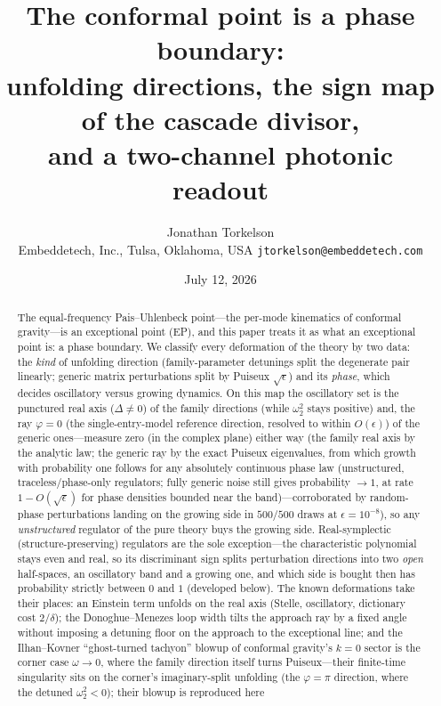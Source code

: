 ﻿\documentclass[11pt]{article}
\title{The conformal point is a phase boundary:\\
unfolding directions, the sign map of the cascade divisor,\\
and a two-channel photonic readout}
\author{Jonathan Torkelson\\[2pt]
\small Embeddetech, Inc., Tulsa, Oklahoma, USA \quad
\texttt{jtorkelson@embeddetech.com}}
\date{July 12, 2026}
\theoremstyle{remark}
\begin{document}
\maketitle

\begin{abstract}
\noindent The equal-frequency Pais--Uhlenbeck point---the per-mode
kinematics of conformal gravity---is an exceptional point (EP), and
this paper treats it as what an exceptional point is: a phase
boundary. We classify every deformation of the theory by two data:
the \emph{kind} of unfolding direction (family-parameter detunings
split the degenerate pair linearly; generic matrix perturbations
split by Puiseux $\sqrt\epsilon$) and its \emph{phase}, which
decides oscillatory versus growing dynamics. On this map the
oscillatory set is the punctured real axis ($\Delta\neq0$) of the family directions (while
$\omega_2^2$ stays positive) and, the ray $\varphi=0$ (the
single-entry-model reference direction, resolved to within $O(\epsilon)$) of the
generic ones---measure zero (in the complex plane) either
way (the family real axis by the analytic law; the generic ray by
the exact Puiseux eigenvalues, from which growth with probability
one follows for any absolutely continuous phase law (unstructured, traceless/phase-only regulators; fully generic noise still gives probability $\to1$, at rate $1-O(\sqrt\epsilon)$ for phase densities bounded near the band)---corroborated by
random-phase perturbations landing on the
growing side in $500/500$ draws at $\epsilon=10^{-8}$),
so any \emph{unstructured} regulator of the pure theory buys the
growing side. Real-symplectic (structure-preserving) regulators are the
sole exception---the characteristic polynomial stays even and real, so
its discriminant sign splits perturbation directions into two
\emph{open} half-spaces, an oscillatory band and a growing one, and
which side is bought then has probability strictly between $0$ and $1$
(developed below). The known deformations take their places: an Einstein term
unfolds on the real axis (Stelle, oscillatory, dictionary cost
$2/\delta$); the Donoghue--Menezes loop width tilts the approach ray
by a fixed angle without imposing a detuning floor on the approach to
the exceptional line; and the
Ilhan--Kovner ``ghost-turned tachyon'' blowup of conformal gravity's
$k=0$ sector is the corner case $\omega\to0$, where the family
direction itself turns Puiseux---their finite-time singularity sits on
the corner's imaginary-split unfolding (the $\varphi=\pi$ direction,
where the detuned $\omega_2^2<0$); their blowup is reproduced here

\end{abstract}
\end{document}

